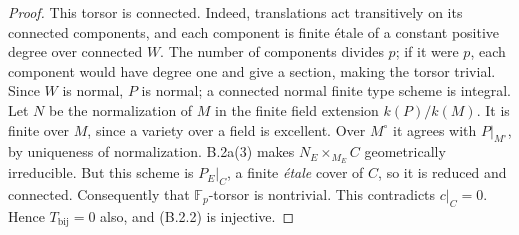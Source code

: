 \begin{proof}
This torsor is connected.  Indeed, translations act transitively
on its connected components, and each component is finite
\'etale of a constant positive degree over connected $W$.
The number of components divides $p$; if it were $p$, each
component would have degree one and give a section, making
the torsor trivial.  Since $W$ is normal, $P$ is normal; a
connected normal finite type scheme is integral.  Let $N$ be
the normalization of $M$ in the finite field extension
$k(P)/k(M)$.  It is finite over $M$, since a variety over a
field is excellent.  Over $M^\circ$ it agrees with
$P|_{M^\circ}$, by uniqueness of normalization.  B.2a(3) makes
$N_E\times_{M_E}C$ geometrically irreducible.  But this scheme
is $P_E|_C$, a finite \emph{\'etale} cover of $C$, so it is
reduced and connected.  Consequently that $\mathbb F_p$-torsor
is nontrivial.  This contradicts $c|_C=0$.  Hence
$T_{\mathrm{bij}}=0$ also, and (B.2.2) is injective.
\end{proof}

